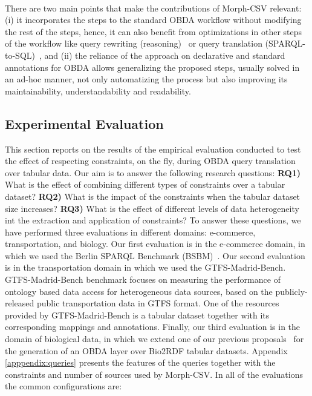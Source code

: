 \paragraph{}
There are two main points that make the contributions of Morph-CSV relevant: (i) it incorporates the steps to the standard OBDA workflow without modifying the rest of the steps, hence, it can also benefit from optimizations in other steps of the workflow like query rewriting (reasoning)~\citep{mora2014kyrie2} or query translation (SPARQL-to-SQL)~\citep{priyatna2014formalisation}, and (ii) the reliance of the approach on declarative and standard annotations for OBDA allows generalizing the proposed steps, usually solved in an ad-hoc manner, not only automatizing the process but also improving its maintainability, understandability and readability.




\subsection{Experimental Evaluation}

This section reports on the results of the empirical evaluation conducted to test the effect of respecting constraints, on the fly, during OBDA query translation over tabular data. Our aim is to answer the following research questions: \textbf{RQ1)} What is the effect of combining different types of constraints over a tabular dataset? \textbf{RQ2)} What is the impact of the constraints when the tabular dataset size increases? \textbf{RQ3)} What is the effect of different levels of data heterogeneity int the extraction and application of constraints? To answer these questions, we have performed three evaluations in different domains: e-commerce, transportation, and biology. Our first evaluation is in the e-commerce domain, in which we used the Berlin SPARQL Benchmark (BSBM)~\cite{bizer2009berlin}. Our second evaluation is in the transportation domain in which we used the GTFS-Madrid-Bench. GTFS-Madrid-Bench benchmark focuses on measuring the performance of ontology based data access for heterogeneous data sources, based on the publicly-released public transportation data in GTFS format. One of the resources provided by GTFS-Madrid-Bench is a tabular dataset together with its corresponding mappings and annotations. Finally, our third evaluation is in the domain of biological data, in which we extend one of our previous proposals~\cite{iglesias2019enhancing} for the generation of an OBDA layer over Bio2RDF tabular datasets. Appendix \ref{apppendix:queries} presents the features of the queries together with the constraints and number of sources used by Morph-CSV. In all of the evaluations the common configurations are:

